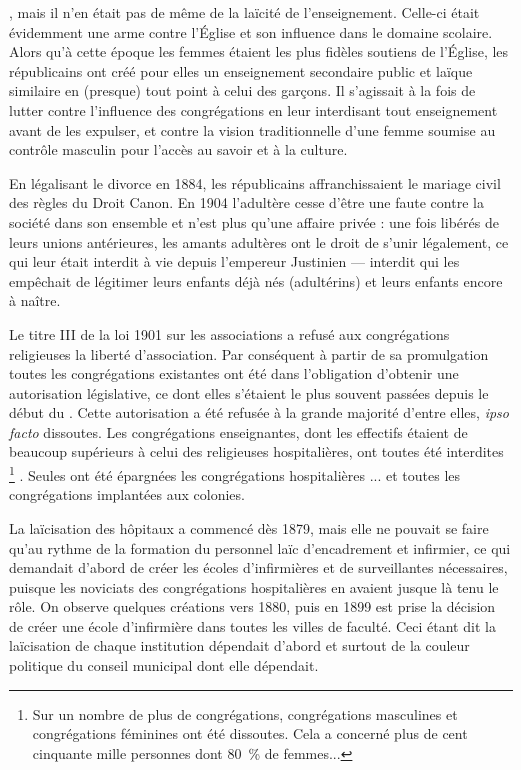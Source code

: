 , mais il n'en était pas de même de la laïcité de l'enseignement. Celle-ci était évidemment une arme contre l'Église et son influence dans le domaine scolaire. Alors qu'à cette époque les femmes étaient les plus fidèles soutiens de l'Église, les républicains ont créé pour elles un enseignement secondaire public et laïque similaire en (presque) tout point à celui des garçons. Il s'agissait à la fois de lutter contre l'influence des congrégations en leur interdisant tout enseignement avant de les expulser, et contre la vision traditionnelle d'une femme soumise au contrôle masculin pour l'accès au savoir et à la culture. 

 En légalisant le divorce en 1884, les républicains affranchissaient le mariage civil des règles du Droit Canon. En 1904 l'adultère cesse d'être une faute contre la société dans son ensemble et n'est plus qu'une affaire privée : une fois libérés de leurs unions antérieures, les amants adultères ont le droit de s'unir légalement, ce qui leur était interdit à vie depuis l'empereur Justinien --- interdit qui les empêchait de légitimer leurs enfants déjà nés (adultérins) et leurs enfants encore à naître. 

 Le titre III de la loi 1901 sur les associations a refusé aux congrégations religieuses la liberté d'association. Par conséquent à partir de sa promulgation toutes les congrégations existantes ont été dans l'obligation d'obtenir une autorisation législative, ce dont elles s'étaient le plus souvent passées depuis le début du . Cette autorisation a été refusée à la grande majorité d'entre elles, \emph{ipso facto} dissoutes. Les congrégations enseignantes, dont les effectifs étaient de beaucoup supérieurs à celui des religieuses hospitalières, ont toutes été interdites%
\footnote{Sur un nombre de plus de  congrégations,  congrégations masculines et  congrégations féminines ont été dissoutes. Cela a concerné plus de cent cinquante mille personnes dont 80~\% de femmes...}%
. Seules ont été épargnées les congrégations hospitalières ... et toutes les congrégations implantées aux colonies. 

 La laïcisation des hôpitaux a commencé dès 1879, mais elle ne pouvait se faire qu'au rythme de la formation du personnel laïc d'encadrement et infirmier, ce qui demandait d'abord de créer les écoles d'infirmières et de surveillantes nécessaires, puisque les noviciats des congrégations hospitalières en avaient jusque là tenu le rôle. On observe quelques créations vers 1880, puis en 1899 est prise la décision de créer une école d'infirmière dans toutes les villes de faculté. Ceci étant dit la laïcisation de chaque institution dépendait d'abord et surtout de la couleur politique du conseil municipal dont elle dépendait.

